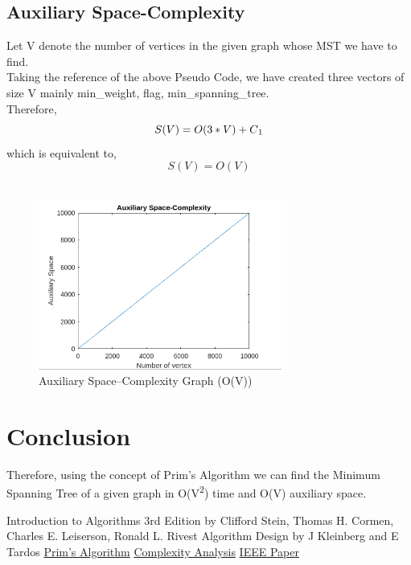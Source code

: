 \documentclass[conference]{IEEEtran}
\begin{document}
\subsection{Auxiliary Space-Complexity}
Let V denote the number of vertices in the given graph whose MST we have to find.\\
Taking  the reference of the above Pseudo Code, we have created three vectors of size V mainly min\_weight, flag, min\_spanning\_tree.\\
Therefore,\\
\begin{equation}
    S(V) = O(3*V) + C\textsubscript{1}
\end{equation}
which is equivalent to,
\begin{equation}
    S(V) = O(V)
\end{equation}
\\
\begin{figure}[htbp]
\centerline{\includegraphics[width=8cm]{Space.png}}
\caption{Auxiliary Space–Complexity Graph (O(V))}
\label{fig}
\end{figure}
\section{Conclusion}
Therefore, using the concept of Prim's Algorithm we can find the Minimum Spanning Tree of a given graph in O(V\textsuperscript{2}) time and O(V) auxiliary space.\\
\begin{thebibliography}{00}
Introduction to Algorithms 3rd Edition by Clifford Stein, Thomas H. Cormen, Charles E. Leiserson, Ronald L. Rivest
 Algorithm Design by J Kleinberg and E Tardos
\href{https://en.wikipedia.org/wiki/Prim\%27s_algorithm}{Prim's Algorithm}
\href{https://stackoverflow.com/questions/11032015/how-to-find-time-complexity-of-an-algorithm}{Complexity Analysis}
\href{https://www.overleaf.com/latex/templates/ieee-conference-template-example/nsncsyjfmpxy}{IEEE Paper}
\end{thebibliography}
\end{document}
